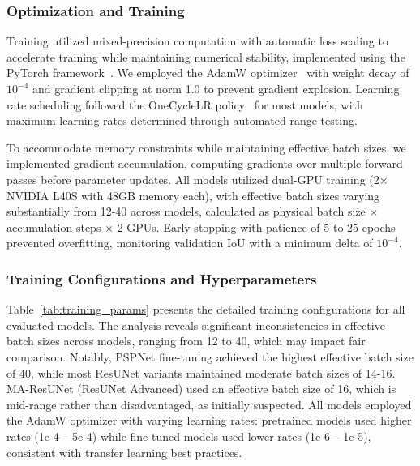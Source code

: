 \documentclass[preprint,12pt]{elsarticle}
\begin{document}
\subsubsection{Optimization and Training}
Training utilized mixed-precision computation with automatic loss scaling to accelerate training while maintaining numerical stability, implemented using the PyTorch framework~\cite{Paszke2019}. We employed the AdamW optimizer~\cite{loshchilov2019decoupled} with weight decay of $10^{-4}$ and gradient clipping at norm 1.0 to prevent gradient explosion. Learning rate scheduling followed the OneCycleLR policy~\cite{smith2018super} for most models, with maximum learning rates determined through automated range testing.

To accommodate memory constraints while maintaining effective batch sizes, we implemented gradient accumulation, computing gradients over multiple forward passes before parameter updates. All models utilized dual-GPU training (2× NVIDIA L40S with 48GB memory each), with effective batch sizes varying substantially from 12-40 across models, calculated as physical batch size × accumulation steps × 2 GPUs. Early stopping with patience of 5 to 25 epochs prevented overfitting, monitoring validation IoU with a minimum delta of $10^{-4}$.

\subsubsection{Training Configurations and Hyperparameters}

Table~\ref{tab:training_params} presents the detailed training configurations for all evaluated models. The analysis reveals significant inconsistencies in effective batch sizes across models, ranging from 12 to 40, which may impact fair comparison. Notably, PSPNet fine-tuning achieved the highest effective batch size of 40, while most ResUNet variants maintained moderate batch sizes of 14-16. MA-ResUNet (ResUNet Advanced) used an effective batch size of 16, which is mid-range rather than disadvantaged, as initially suspected. All models employed the AdamW optimizer with varying learning rates: pretrained models used higher rates (1e-4 – 5e-4) while fine-tuned models used lower rates (1e-6 – 1e-5), consistent with transfer learning best practices.
\end{document}
